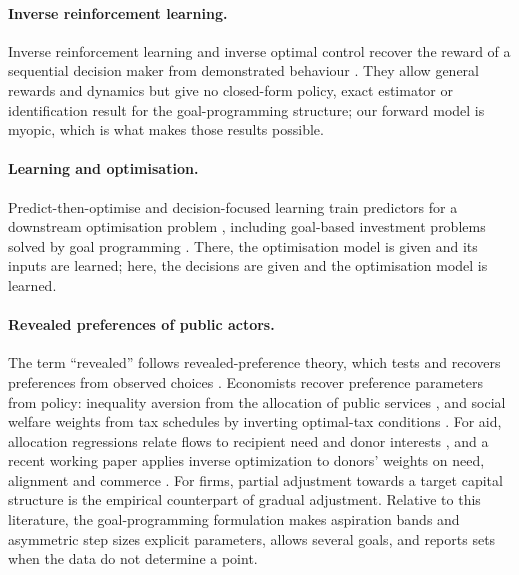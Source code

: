 \documentclass[11pt,a4paper]{article}
\theoremstyle{remark}\newtheorem{remark}{Remark}
\begin{document}
\paragraph{Inverse reinforcement learning.} Inverse reinforcement learning and inverse optimal control recover the reward of a sequential decision maker from demonstrated behaviour \citep{ng2000,ziebart2008}. They allow general rewards and dynamics but give no closed-form policy, exact estimator or identification result for the goal-programming structure; our forward model is myopic, which is what makes those results possible.

\paragraph{Learning and optimisation.} Predict-then-optimise and decision-focused learning train predictors for a downstream optimisation problem \citep{elmachtoub2022,hu2022,mandi2024}, including goal-based investment problems solved by goal programming \citep{bae2026}. There, the optimisation model is given and its inputs are learned; here, the decisions are given and the optimisation model is learned.

\paragraph{Revealed preferences of public actors.} The term ``revealed'' follows revealed-preference theory, which tests and recovers preferences from observed choices \citep{samuelson1938,afriat1967,varian1982}. Economists recover preference parameters from policy: inequality aversion from the allocation of public services \citep{behrman1987}, and social welfare weights from tax schedules by inverting optimal-tax conditions \citep{bourguignon2012,saez2016,hendren2020,lockwood2016}. For aid, allocation regressions relate flows to recipient need and donor interests \citep{alesina2000}, and a recent working paper applies inverse optimization to donors' weights on need, alignment and commerce \citep{karamifard2026}. For firms, partial adjustment towards a target capital structure \citep{flannery2006} is the empirical counterpart of gradual adjustment. Relative to this literature, the goal-programming formulation makes aspiration bands and asymmetric step sizes explicit parameters, allows several goals, and reports sets when the data do not determine a point.
\end{document}
